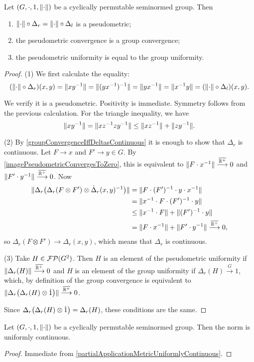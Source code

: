 \begin{proposition} \label{groupSeminormConvergence}
Let $\sSet{G, \cdot, 1, \norm{\cdot}}$ be a cyclically permutable seminormed group. Then 
\begin{enumerate}
\item $\lVert\cdot\rVert\circ \Delta_r = \lVert\cdot\rVert\circ \Delta_l$ is a pseudometric;
\item the pseudometric convergence is a group convergence;
\item the pseudometric uniformity is equal to the group uniformity.
\end{enumerate} 
\end{proposition}
\begin{proof}
(1) We first calculate the equality:
\[ (\lVert\cdot\rVert\circ \Delta_r)(x,y) = \lVert xy^{-1}\rVert = \lVert(yx^{-1})^{-1}\rVert = \lVert yx^{-1}\rVert = \lVert x^{-1}y\rVert = (\lVert\cdot\rVert\circ \Delta_l)(x,y). \]

We verify it is a pseudometric. Positivity is immediate. Symmetry follows from the previous calculation. For the triangle inequality, we have
\[ \lVert xy^{-1}\rVert = \lVert xz^{-1}zy^{-1}\rVert \leq \lVert xz^{-1}\rVert + \lVert zy^{-1}\rVert. \]

(2) By \ref{groupConvergenceIffDeltasContinuous} it is enough to show that $\Delta_r$ is continuous. Let $F\to x$ and $F'\to y\in G$. By \ref{imagePseudometricConvergesToZero}, this is equivalent to $\lVert F\cdot x^{-1}\rVert \overset{\overline{\mathbb{R}^+}}{\longrightarrow} 0$ and $\lVert F'\cdot y^{-1}\rVert \overset{\overline{\mathbb{R}^+}}{\longrightarrow} 0$. Now
\begin{align*}
\lVert\Delta_r\big(\Delta_r(F\otimes F')\otimes \dot\Delta_r(x,y)^{-1}\big)\rVert &= \lVert F\cdot (F')^{-1}\cdot y\cdot x^{-1}\rVert \\
&= \lVert x^{-1}\cdot F\cdot (F')^{-1}\cdot y\rVert \\
&\leq \lVert x^{-1}\cdot F\rVert+ \lVert(F')^{-1}\cdot y\rVert \\
&= \lVert F\cdot x^{-1}\rVert + \lVert F'\cdot y^{-1}\rVert \overset{\overline{\mathbb{R}^+}}{\longrightarrow} 0,
\end{align*}
so $\Delta_r(F\otimes F')\to \Delta_r(x,y)$, which means that $\Delta_r$ is continuous.

(3) Take $H\in\operatorname{\mathcal{FP}}(G^2)$. Then $H$ is an element of the pseudometric uniformity if $\lVert\Delta_r(H)\rVert\overset{\overline{\mathbb{R}^+}}{\longrightarrow} 0$ and $H$ is an element of the group uniformity if $\Delta_r(H)\overset{G}{\longrightarrow} 1$, which, by definition of the group convergence is equivalent to $\lVert\Delta_r\big(\Delta_r(H)\otimes\dot{1}\big)\rVert\overset{\overline{\mathbb{R}^+}}{\longrightarrow} 0$.

Since $\Delta_r\big(\Delta_r(H)\otimes\dot{1}\big) = \Delta_r(H)$, these conditions are the same.
\end{proof}
\begin{corollary} \label{normUniformlyContinuous}
Let $\sSet{G, \cdot, 1, \norm{\cdot}}$ be a cyclically permutable seminormed group. Then the norm is uniformly continuous.
\end{corollary}
\begin{proof}
Immediate from \ref{partialApplicationMetricUniformlyContinuous}.
\end{proof}

